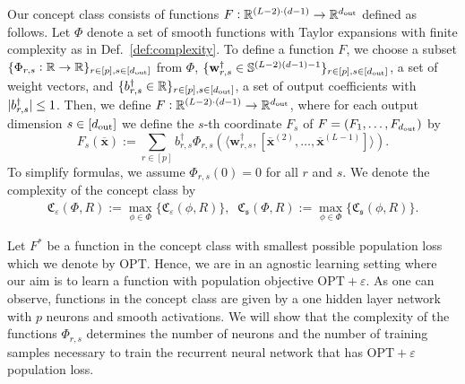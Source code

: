 \begin{definition}\label{def:concept_class}
	Our concept class consists of functions $F: \mathbb{R}^{(L-2) \cdot (d-1)} \rightarrow \mathbb{R}^{d_{\mathrm{out}} }$ defined as follows.
	Let $\Phi$ denote a set of smooth functions with Taylor expansions with finite complexity as in Def.~\ref{def:complexity}. To define a function $F$, we choose a subset $\{\Phi_{r, s}: \mathbb{R} \rightarrow \mathbb{R}\}_{r \in [p], s \in [d_{\mathrm{out}} ]}$ from $\Phi$,  $\{\mathbf{w}_{r, s}^{\dagger} \in \mathbb{S}^{(L-2)(d-1)-1}\}_{r \in[p], s \in[d_{\mathrm{out}} ]}$, a set of weight vectors, and $\{b_{r, s}^{\dagger} \in \mathbb{R}\}_{r \in[p], s \in[d_{\mathrm{out}} ]}$, a set of output coefficients with $\abs[0]{b_{r, s}^\dagger} \leq 1$. Then, we define $F: \mathbb{R}^{(L-2) \cdot (d-1)} \rightarrow \mathbb{R}^{d_{\mathrm{out}} }$, where for each output dimension $s \in [d_{\mathrm{out}} ]$ we define the $s$-th coordinate $F_s$ of $F=(F_1, \ldots, F_{d_{\mathrm{out}} })$ by
	\begin{equation}\label{eq:concept_class}
		F_s(\overline{\mathbf{x}}) := \sum_{r \in [p]} b_{r, s}^{\dagger} \Phi_{r, s} \left(\langle  \mathbf{w}_{r, s}^{\dagger}, [\overline{\mathbf{x}}^{(2)}, \ldots, \overline{\mathbf{x}}^{(L-1)}]\rangle\right).
	\end{equation}
	To simplify formulas, we assume $\Phi_{r, s}(0)=0$ for all $r$ and $s$. 
	We denote the complexity of the concept class by
	\begin{align*}
		\mathfrak{C}_{\varepsilon}(\Phi, R):=\max_{\phi \in \Phi}\{\mathfrak{C}_{\varepsilon}(\phi, R)\}, \;\;
		\mathfrak{C}_{\mathfrak{s}}(\Phi, R):=\max _{\phi \in \Phi}\{\mathfrak{C}_{\mathfrak{s}}(\phi, R)\}.
	\end{align*}
\end{definition}
\vspace{-2mm}
	Let $F^{\ast}$ be a function in the concept class with smallest possible population loss which we denote by $\mathrm{OPT}$. Hence, we are in an agnostic learning setting where our aim is to learn a function with population objective $\mathrm{OPT} + \varepsilon$. 
As one can observe, functions in the concept class are given by a one hidden layer network with $p$ neurons and smooth activations. We will show that the complexity of the functions $\Phi_{r, s}$ determines the number of neurons and the number of training samples necessary to train the recurrent neural network that has $\mathrm{OPT} + \varepsilon$ population loss. 

